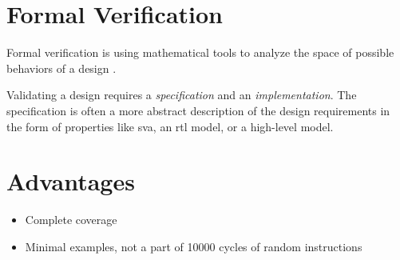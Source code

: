 %
%
%
%
%
%
%
%
%
%
%
%
%

\section{Formal Verification}



Formal verification is using mathematical tools to analyze the space of possible behaviors of a design \cite{seligmanFormalVerificationEssential2015}.

Validating a design requires a \textit{specification} and an \textit{implementation}. The specification is often a more abstract description of the design requirements in the form of properties like \acrfull{sva}, an \acrshort{rtl} model, or a high-level model\cite[p. 26]{seligmanFormalVerificationEssential2015}. 

\section{Advantages}

\begin{itemize}
    \item Complete coverage
    \item Minimal examples, not a part of 10000 cycles of random instructions
\end{itemize}



